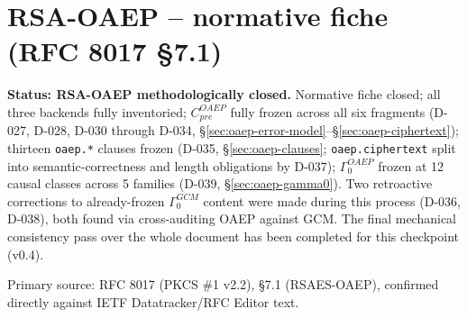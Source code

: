 \documentclass[11pt,a4paper]{article}
\begin{document}
\section{RSA-OAEP -- normative fiche (RFC 8017 \S7.1)}\label{sec:oaep}
\textbf{Status: RSA-OAEP methodologically closed.} Normative fiche closed; all three backends fully inventoried; $C_{pre}^{OAEP}$ fully frozen across all six fragments (D-027, D-028, D-030 through D-034, \S\ref{sec:oaep-error-model}--\S\ref{sec:oaep-ciphertext}); thirteen \texttt{oaep.*} clauses frozen (D-035, \S\ref{sec:oaep-clauses}; \texttt{oaep.ciphertext} split into semantic-correctness and length obligations by D-037); $\Gamma_0^{OAEP}$ frozen at 12 causal classes across 5 families (D-039, \S\ref{sec:oaep-gamma0}). Two retroactive corrections to already-frozen $\Gamma_0^{GCM}$ content were made during this process (D-036, D-038), both found via cross-auditing OAEP against GCM. The final mechanical consistency pass over the whole document has been completed for this checkpoint (v0.4).

Primary source: RFC 8017 (PKCS \#1 v2.2), \S7.1 (RSAES-OAEP), confirmed directly against IETF Datatracker/RFC Editor text.
\end{document}
